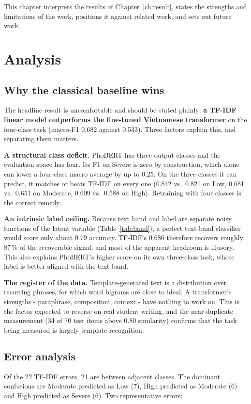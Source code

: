 This chapter interprets the results of Chapter~\ref{ch:result}, states the strengths and limitations of the work, positions it against related work, and sets out future work.

\section{Analysis}

\subsection{Why the classical baseline wins}
The headline result is uncomfortable and should be stated plainly: \textbf{a TF-IDF linear model outperforms the fine-tuned Vietnamese transformer} on the four-class task (macro-F1 0.682 against 0.533). Three factors explain this, and separating them matters.

\textbf{A structural class deficit.} PhoBERT has three output classes and the evaluation space has four. Its F1 on Severe is zero by construction, which alone can lower a four-class macro average by up to 0.25. On the three classes it can predict, it matches or beats TF-IDF on every one (0.842 vs.\ 0.821 on Low, 0.681 vs.\ 0.651 on Moderate, 0.609 vs.\ 0.588 on High). Retraining with four classes is the correct remedy.

\textbf{An intrinsic label ceiling.} Because text band and label are separate noisy functions of the latent variable (Table~\ref{tab:band}), a perfect text-band classifier would score only about 0.79 accuracy. TF-IDF's 0.686 therefore recovers roughly 87\,\% of the recoverable signal, and most of the apparent headroom is illusory. This also explains PhoBERT's higher score on its own three-class task, whose label is better aligned with the text band.

\textbf{The register of the data.} Template-generated text is a distribution over recurring phrases, for which word bigrams are close to ideal. A transformer's strengths - paraphrase, composition, context - have nothing to work on. This is the factor expected to reverse on real student writing, and the near-duplicate measurement (34 of 70 test items above 0.80 similarity) confirms that the task being measured is largely template recognition.

\subsection{Error analysis}
Of the 22 TF-IDF errors, 21 are between adjacent classes. The dominant confusions are Moderate predicted as Low (7), High predicted as Moderate (6) and High predicted as Severe (6). Two representative errors:

